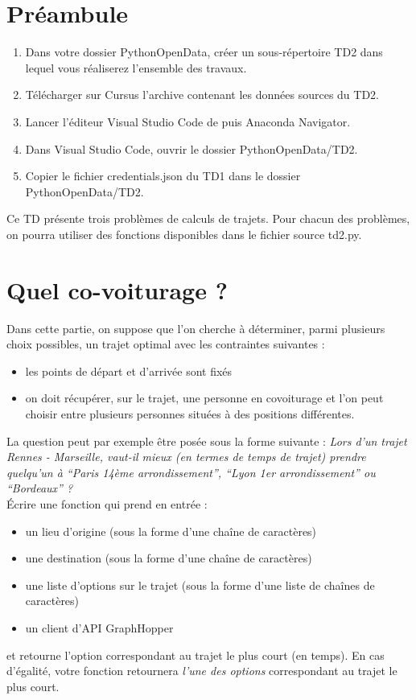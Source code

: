 \documentclass[11pt,a4paper]{article}
\begin{document}
\section*{Préambule}
\begin{enumerate}
    \item Dans votre dossier PythonOpenData, créer un sous-répertoire TD2 dans lequel vous réaliserez l'ensemble des travaux. 
    \item Télécharger sur Cursus l'archive contenant les données sources du TD2.
    \item Lancer l'éditeur Visual Studio Code de puis Anaconda Navigator.
    \item Dans Visual Studio Code, ouvrir le dossier PythonOpenData/TD2. 
    \item Copier le fichier credentials.json du TD1 dans le dossier PythonOpenData/TD2.
\end{enumerate}

Ce TD présente trois problèmes de calculs de trajets. Pour chacun des problèmes, on pourra utiliser des fonctions disponibles dans le fichier source td2.py.

\section{Quel co-voiturage ?}

Dans cette partie, on suppose que l’on cherche à déterminer, parmi plusieurs choix possibles, un trajet optimal avec les contraintes suivantes :
\begin{itemize}
    \item les points de départ et d’arrivée sont fixés
    \item on doit récupérer, sur le trajet, une personne en covoiturage et l’on peut choisir entre plusieurs personnes situées à des positions différentes.
\end{itemize}

La question peut par exemple être posée sous la forme suivante : \emph{
    Lors d’un trajet Rennes - Marseille, vaut-il mieux (en termes de temps de trajet) prendre quelqu’un à “Paris 14ème arrondissement”, “Lyon 1er arrondissement” ou “Bordeaux” ? }
\\

    Écrire une fonction qui prend en entrée :
    \begin{itemize}
        \item un lieu d’origine (sous la forme d’une chaîne de caractères)
        \item une destination (sous la forme d’une chaîne de caractères)
        \item une liste d’options sur le trajet (sous la forme d’une liste de chaînes de caractères)
        \item un client d’API GraphHopper
    \end{itemize}
    et retourne l’option correspondant au trajet le plus court (en temps). En cas d’égalité, votre fonction retournera \emph{l’une des options} correspondant au trajet le plus court.
\end{document}
